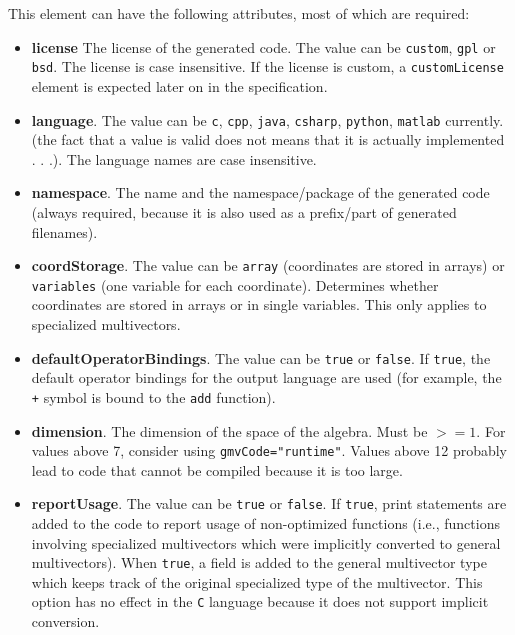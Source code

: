 \documentclass[10pt, a4paper]{article}
\begin{document}
This element can have the following attributes, most of which are required:
\begin{itemize}
\item {\bf license} The license of the generated code. The value can be {\tt custom}, {\tt gpl} or {\tt bsd}. The license is case insensitive.
If the license is custom, a {\tt customLicense} element is expected later on in the specification.

\item {\bf language}. The value can be {\tt c}, {\tt cpp}, {\tt java}, {\tt csharp}, {\tt python}, {\tt matlab} currently. 
(the fact that a value is valid does not means that it is actually implemented . . .). The language names are case insensitive.

\item {\bf namespace}. The name and the namespace/package of the generated code (always required, because it is also used as a prefix/part of generated filenames).

\item {\bf coordStorage}. The value can be {\tt array} (coordinates are stored in arrays) or {\tt variables} (one variable for each coordinate). 
Determines whether coordinates are stored in arrays or in single variables. This only applies to specialized multivectors. 

\item {\bf defaultOperatorBindings}. The value can be {\tt true} or {\tt false}. If {\tt true}, the default operator bindings for the output language are used 
(for example, the {\tt +} symbol is bound to the {\tt add} function).

\item {\bf dimension}. The dimension of the space of the algebra. Must be $>= 1$. 
For values above 7, consider using {\tt gmvCode="runtime"}.
Values above 12 probably lead to code that cannot be compiled because it is too large.

\item {\bf reportUsage}. The value can be {\tt true} or {\tt false}. If {\tt true}, print statements are added to the code to report usage of non-optimized functions
       (i.e., functions involving specialized multivectors which were implicitly converted to general multivectors). 
       When {\tt true}, a field is added to the general multivector type which keeps track of the original specialized 
       type of the multivector. This option has no effect in the {\tt C} language because it does not support implicit conversion.
 

\end{itemize}
\end{document}
